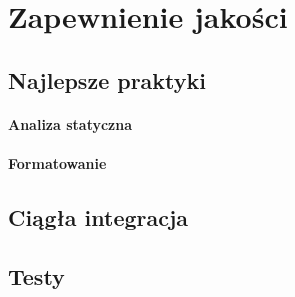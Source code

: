 \section{Zapewnienie jakości}

\subsection{Najlepsze praktyki}
\paragraph{Analiza statyczna}
\paragraph{Formatowanie}

\subsection{Ciągła integracja}
\subsection{Testy} 
